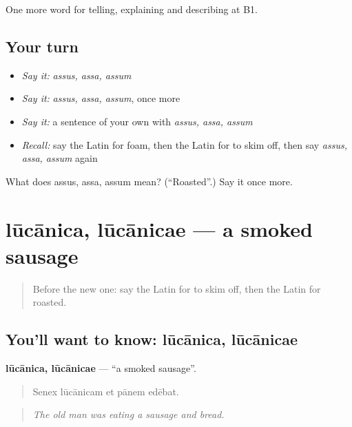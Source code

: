 \begin{grammarlens}[title={What you've built}]
One more word for telling, explaining and describing at B1.
\end{grammarlens}

\subsection*{Your turn}
\begin{itemize}
\raggedright
  \item \emph{Say it:} \emph{assus, assa, assum}
  \item \emph{Say it:} \emph{assus, assa, assum}, once more
  \item \emph{Say it:} a sentence of your own with \emph{assus, assa, assum}
  \item \emph{Recall:} say the Latin for foam, then the Latin for to skim off, then say \emph{assus, assa, assum} again
\end{itemize}

\begin{tcolorbox}[breakable,colback=teal!4,colframe=teal!35!black,title={Before you move on}]
What does assus, assa, assum mean? (\textquotedblleft{}Roasted\textquotedblright{}.) Say it once more.
\end{tcolorbox}
\section[lūcānica, lūcānicae]{lūcānica, lūcānicae — a smoked sausage}

\label{lesson:LA-C354-lucanica}



\begin{quote}
Before the new one: say the Latin for to skim off, then the Latin for roasted.
\end{quote}

\subsection*{You'll want to know: lūcānica, lūcānicae}
\textbf{lūcānica, lūcānicae} — \textquotedblleft{}a smoked sausage\textquotedblright{}.

\begin{quote}
Senex lūcānicam et pānem edēbat.
\end{quote}

\begin{quote}
\emph{The old man was eating a sausage and bread.}
\end{quote}


